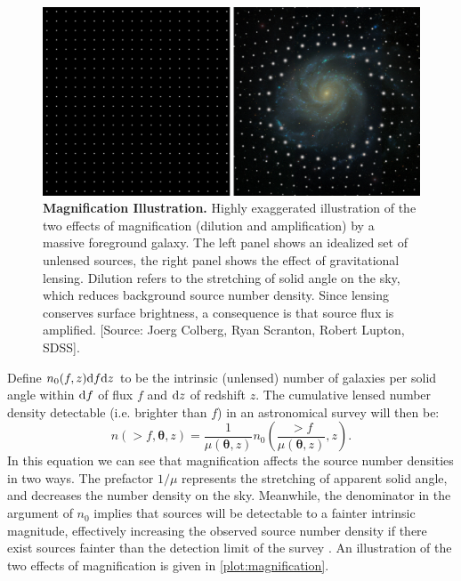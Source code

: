 \begin{figure}
\begin{center}
\includegraphics[scale=0.4]{plots_intro/Magnification.png}
\caption[Magnification Illustration]{{\bf Magnification Illustration.} Highly exaggerated illustration of the two effects of magnification (dilution and amplification) by a massive foreground galaxy. The left panel shows an idealized set of unlensed sources, the right panel shows the effect of gravitational lensing. Dilution refers to the stretching of solid angle on the sky, which reduces background source number density. Since lensing conserves surface brightness, a consequence is that source flux is amplified. [Source: Joerg Colberg, Ryan Scranton, Robert Lupton, \ac{SDSS}].}
\label{plot:magnification}
\end{center}
\end{figure}

Define $n_0(f,z){\rm d}f{\rm d}z$ to be the intrinsic (unlensed) number of galaxies per solid angle within ${\rm d}f$ of flux $f$ and ${\rm d}z$ of redshift $z$. The cumulative lensed number density detectable (i.e. brighter than $f$) in an astronomical survey will then be:
\begin{equation}
n(>f,\bm{\theta},z) = \frac{1}{\mu(\bm{\theta},z)} n_0\left(\frac{>f}{\mu(\bm{\theta},z)},z\right).
\end{equation}
In this equation we can see that magnification affects the source number densities in two ways. The prefactor $1/\mu$ represents the stretching of apparent solid angle, and decreases the number density on the sky. Meanwhile, the denominator in the argument of $n_0$ implies that sources will be detectable to a fainter intrinsic magnitude, effectively increasing the observed source number density if there exist sources fainter than the detection limit of the survey \citep{Schneider06_WeakGravLens}. An illustration of the two effects of magnification is given in \autoref{plot:magnification}.

